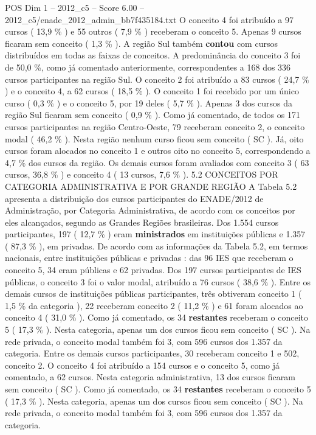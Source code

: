 \begin{textsample}{POS Dim 1 – 2012\_c5 – Score 6.00 – 2012\_c5/enade\_2012\_admin\_bb7f435184.txt}
O conceito 4 foi atribuído a 97 cursos ( 13,9 \% ) e 55 outros ( 7,9 \% ) receberam o conceito 5.
Apenas 9 cursos ficaram sem conceito ( 1,3 \% ).
A região Sul também \textbf{contou} com cursos distribuídos em todas as faixas de conceitos.
A predominância do conceito 3 foi de 50,0 \%, como já comentado anteriormente, correspondentes a 168 dos 336 cursos participantes na região Sul.
O conceito 2 foi atribuído a 83 cursos ( 24,7 \% ) e o conceito 4, a 62 cursos ( 18,5 \% ).
O conceito 1 foi recebido por um único curso ( 0,3 \% ) e o conceito 5, por 19 deles ( 5,7 \% ).
Apenas 3 dos cursos da região Sul ficaram sem conceito ( 0,9 \% ).
Como já comentado, de todos os 171 cursos participantes na região Centro-Oeste, 79 receberam conceito 2, o conceito modal ( 46,2 \% ).
Nesta região nenhum curso ficou sem conceito ( SC ).
Já, oito cursos foram alocados no conceito 1 e outros oito no conceito 5, correspondendo a 4,7 \% dos cursos da região.
Os demais cursos foram avaliados com conceito 3 ( 63 cursos, 36,8 \% ) e conceito 4 ( 13 cursos, 7,6 \% ). 5.2 CONCEITOS POR CATEGORIA ADMINISTRATIVA E POR GRANDE REGIÃO A Tabela 5.2 apresenta a distribuição dos cursos participantes do ENADE/2012 de Administração, por Categoria Administrativa, de acordo com os conceitos por eles alcançados, segundo as Grandes Regiões brasileiras.
Dos 1.554 cursos participantes, 197 ( 12,7 \% ) eram \textbf{ministrados} em instituições públicas e 1.357 ( 87,3 \% ), em privadas.
De acordo com as informações da Tabela 5.2, em termos nacionais, entre instituições públicas e privadas : das 96 IES que receberam o conceito 5, 34 eram públicas e 62 privadas.
Dos 197 cursos participantes de IES públicas, o conceito 3 foi o valor modal, atribuído a 76 cursos ( 38,6 \% ).
Entre os demais cursos de instituições públicas participantes, três obtiveram conceito 1 ( 1,5 \% da categoria ), 22 receberam conceito 2 ( 11,2 \% ) e 61 foram alocados ao conceito 4 ( 31,0 \% ).
Como já comentado, os 34 \textbf{restantes} receberam o conceito 5 ( 17,3 \% ).
Nesta categoria, apenas um dos cursos ficou sem conceito ( SC ).
Na rede privada, o conceito modal também foi 3, com 596 cursos dos 1.357 da categoria.
Entre os demais cursos participantes, 30 receberam conceito 1 e 502, conceito 2.
O conceito 4 foi atribuído a 154 cursos e o conceito 5, como já comentado, a 62 cursos.
Nesta categoria administrativa, 13 dos cursos ficaram sem conceito ( SC ).
Como já comentado, os 34 \textbf{restantes} receberam o conceito 5 ( 17,3 \% ).
Nesta categoria, apenas um dos cursos ficou sem conceito ( SC ).
Na rede privada, o conceito modal também foi 3, com 596 cursos dos 1.357 da categoria.

\end{textsample}
